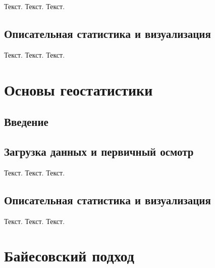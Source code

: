 \documentclass[
  letterpaper,
  DIV=11,
  numbers=noendperiod]{scrreprt}
\begin{document}
Текст. Текст. Текст.

\section{Описательная статистика и
визуализация}\label{ux43eux43fux438ux441ux430ux442ux435ux43bux44cux43dux430ux44f-ux441ux442ux430ux442ux438ux441ux442ux438ux43aux430-ux438-ux432ux438ux437ux443ux430ux43bux438ux437ux430ux446ux438ux44f-1}

Текст. Текст. Текст.


\chapter{Основы
геостатистики}\label{ux43eux441ux43dux43eux432ux44b-ux433ux435ux43eux441ux442ux430ux442ux438ux441ux442ux438ux43aux438}

\section{Введение}\label{ux432ux432ux435ux434ux435ux43dux438ux435-4}

\section{Загрузка данных и первичный
осмотр}\label{ux437ux430ux433ux440ux443ux437ux43aux430-ux434ux430ux43dux43dux44bux445-ux438-ux43fux435ux440ux432ux438ux447ux43dux44bux439-ux43eux441ux43cux43eux442ux440-2}

Текст. Текст. Текст.

\section{Описательная статистика и
визуализация}\label{ux43eux43fux438ux441ux430ux442ux435ux43bux44cux43dux430ux44f-ux441ux442ux430ux442ux438ux441ux442ux438ux43aux430-ux438-ux432ux438ux437ux443ux430ux43bux438ux437ux430ux446ux438ux44f-2}

Текст. Текст. Текст.


\chapter{Байесовский
подход}\label{ux431ux430ux439ux435ux441ux43eux432ux441ux43aux438ux439-ux43fux43eux434ux445ux43eux434}
\end{document}
